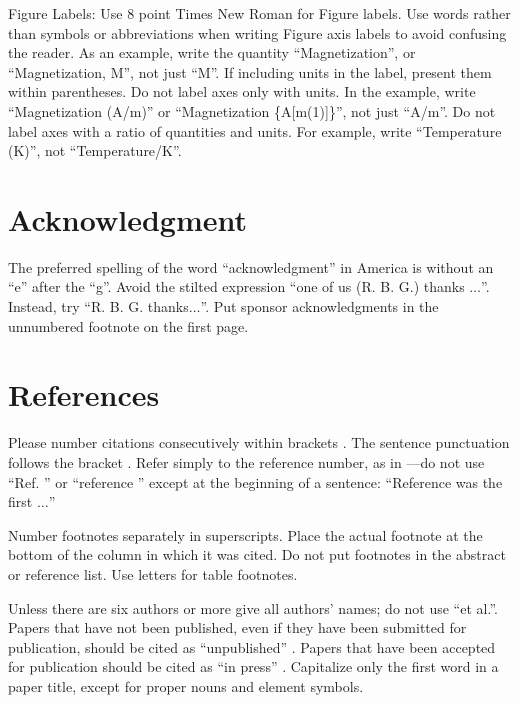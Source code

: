 \documentclass[conference]{IEEEtran}
\begin{document}

Figure Labels: Use 8 point Times New Roman for Figure labels. Use words 
rather than symbols or abbreviations when writing Figure axis labels to 
avoid confusing the reader. As an example, write the quantity 
``Magnetization'', or ``Magnetization, M'', not just ``M''. If including 
units in the label, present them within parentheses. Do not label axes only 
with units. In the example, write ``Magnetization (A/m)'' or ``Magnetization 
\{A[m(1)]\}'', not just ``A/m''. Do not label axes with a ratio of 
quantities and units. For example, write ``Temperature (K)'', not 
``Temperature/K''.

\section*{Acknowledgment}

The preferred spelling of the word ``acknowledgment'' in America is without 
an ``e'' after the ``g''. Avoid the stilted expression ``one of us (R. B. 
G.) thanks $\ldots$''. Instead, try ``R. B. G. thanks$\ldots$''. Put sponsor 
acknowledgments in the unnumbered footnote on the first page.

\section*{References}

Please number citations consecutively within brackets \cite{maxwell1892}. The 
sentence punctuation follows the bracket \cite{b2}. Refer simply to the reference 
number, as in \cite{b3}---do not use ``Ref. \cite{b3}'' or ``reference \cite{b3}'' except at 
the beginning of a sentence: ``Reference \cite{b3} was the first $\ldots$''

Number footnotes separately in superscripts. Place the actual footnote at 
the bottom of the column in which it was cited. Do not put footnotes in the 
abstract or reference list. Use letters for table footnotes.

Unless there are six authors or more give all authors' names; do not use 
``et al.''. Papers that have not been published, even if they have been 
submitted for publication, should be cited as ``unpublished'' \cite{b4}. Papers 
that have been accepted for publication should be cited as ``in press'' \cite{b5}. 
Capitalize only the first word in a paper title, except for proper nouns and 
element symbols.
\end{document}
